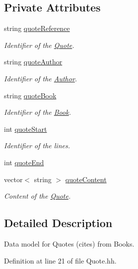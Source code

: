 \subsection*{Private Attributes}
\begin{DoxyCompactItemize}
\item 
string \hyperlink{class_quote_a9c7b2deff2ee9a0a216c360fe304202a}{quote\+Reference}
\begin{DoxyCompactList}\small\item\em Identifier of the \hyperlink{class_quote}{Quote}. \end{DoxyCompactList}\item 
string \hyperlink{class_quote_a930113c4ee0ae5e5506bbc1ea3e79b49}{quote\+Author}
\begin{DoxyCompactList}\small\item\em Identifier of the \hyperlink{class_author}{Author}. \end{DoxyCompactList}\item 
string \hyperlink{class_quote_a7e6968e086bdd45b40627a37ecbbf6fc}{quote\+Book}
\begin{DoxyCompactList}\small\item\em Identifier of the \hyperlink{class_book}{Book}. \end{DoxyCompactList}\item 
int \hyperlink{class_quote_ac426122ac24638740b2a5c5e8342e8c9}{quote\+Start}
\begin{DoxyCompactList}\small\item\em Identifier of the lines. \end{DoxyCompactList}\item 
int \hyperlink{class_quote_aa5953a477b96183c8dc2fc8a42001c29}{quote\+End}
\item 
vector$<$ string $>$ \hyperlink{class_quote_a0ffcb584920e14d7dd5c45820997f989}{quote\+Content}
\begin{DoxyCompactList}\small\item\em Content of the \hyperlink{class_quote}{Quote}. \end{DoxyCompactList}\end{DoxyCompactItemize}


\subsection{Detailed Description}
Data model for Quotes (cites) from Books. 

Definition at line 21 of file Quote.\+hh.



